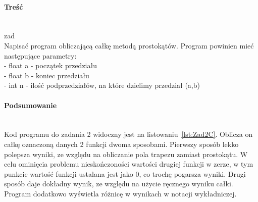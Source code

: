\paragraph{Treść}~\\
{zad}\\
Napisać program obliczającą całkę metodą prostokątów.
Program powinien mieć następujące parametry:\\
- float a - początek przedziału\\
- float b - koniec przedziału\\
- int n - ilość podprzedziałów, na które dzielimy przedział (a,b)



\paragraph{Podsumowanie}~\\
Kod programu do zadania 2 widoczny jest na listowaniu~\ref{lst:Zad2C}.
Oblicza on całkę oznaczoną danych 2 funkcji dwoma sposobami.
Pierwszy sposób lekko polepsza wyniki, ze względu na obliczanie pola trapezu zamiast prostokątu.
W celu ominięcia problemu nieskończoności wartości drugiej funkcji w zerze, w tym punkcie wartość funkcji ustalana jest jako 0, co trochę pogarsza wyniki.
Drugi sposób daje dokładny wynik, ze względu na użycie ręcznego wyniku całki.
Program dodatkowo wyświetla różnicę w wynikach w notacji wykładniczej.
